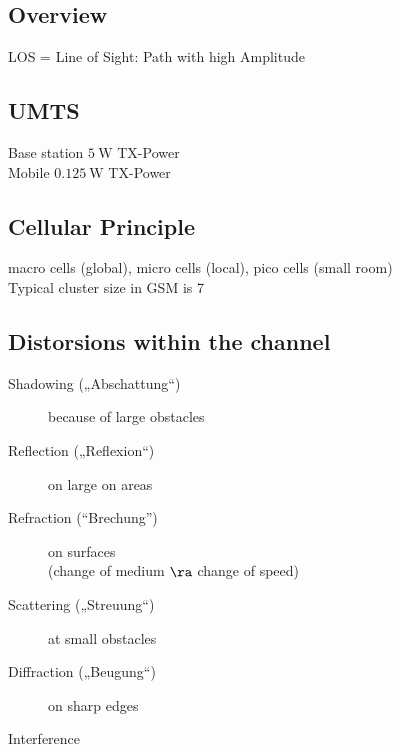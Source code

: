 \documentclass[fs, footer]{latex4ei}
\begin{document}
\begin{multicols*}{4}



\section{Overview}

LOS = Line of Sight: Path with high Amplitude

	\subsection{UMTS}
	Base station $\SI{5}{\watt}$ TX-Power\\
	Mobile $\SI{0.125}{\watt}$ TX-Power

	\subsection{Cellular Principle}
	macro cells (global), micro cells (local), pico cells (small room)\\
	Typical cluster size in GSM is 7


	\subsection{Distorsions within the channel}
	\begin{description}
		\item[Shadowing („Abschattung“)] because of large obstacles
		\item[Reflection („Reflexion“)] on large on areas
		\item[Refraction (“Brechung”)] on surfaces \\ (change of medium $\ra$ change of speed)
		\item[Scattering („Streuung“)] at small obstacles
		\item[Diffraction („Beugung“)] on sharp edges
		\item[Interference]
	\end{description}


\end{multicols*}
\end{document}
